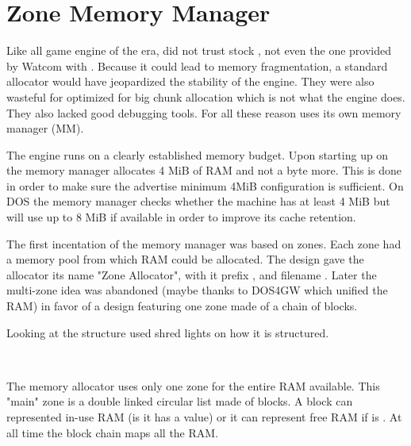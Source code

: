 \section{Zone Memory Manager}
Like all game engine of the era, \doom did not trust stock , not even the one provided by Watcom with . Because it could lead to memory fragmentation, a standard allocator would have jeopardized the stability of the engine. They were also wasteful for optimized for big chunk allocation which is not what the engine does. They also lacked good debugging tools. For all these reason \doom uses its own memory manager (MM).\\
\par

The engine runs on a clearly established memory budget. Upon starting up on \NeXT the memory manager allocates 4 MiB of RAM and not a byte more. This is done in order to make sure the advertise minimum 4MiB configuration is sufficient. On DOS the memory manager checks whether the machine has at least 4 MiB but will use up to 8 MiB if available in order to improve its cache retention.\\
\par
The first incentation of the memory manager was based on zones. Each zone had a memory pool from which RAM could be allocated. The design gave the allocator its name "Zone Allocator", with it prefix , and filename . Later the multi-zone idea was abandoned (maybe thanks to DOS4GW which unified the RAM) in favor of a design featuring one zone made of a chain of blocks.\\
\par
Looking at the structure used shred lights on how it is structured.\\
\par
{}\\
\par
The memory allocator uses only one zone for the entire RAM available. This "main" zone is a double linked circular list made of blocks. A block can represented in-use RAM (is it has a  value) or it can represent free RAM if  is . At all time the block chain maps all the RAM.\\
\par



